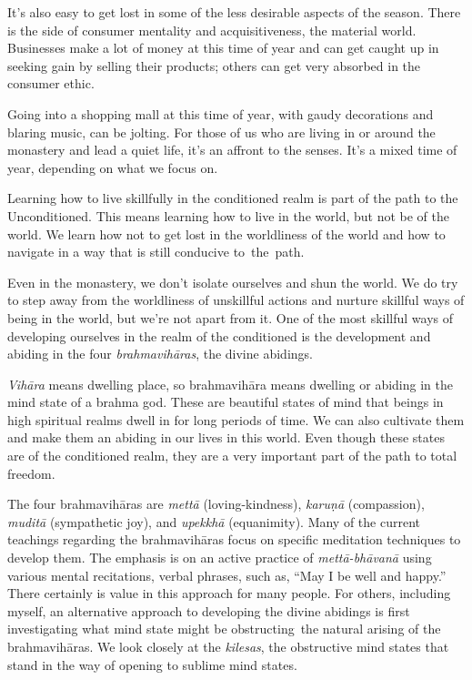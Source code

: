 It's also easy to get lost in some of the less desirable aspects of the season. There is the side of consumer mentality and acquisitiveness, the material world. Businesses make a lot of money at this time of year and can get caught up in seeking gain by selling their products; others can get very absorbed in the consumer ethic.

Going into a shopping mall at this time of year, with gaudy decorations and blaring music, can be jolting. For those of us who are living in or around the monastery and lead a quiet life, it's an affront to the senses. It's a mixed time of year, depending on what we focus on.

Learning how to live skillfully in the conditioned realm is part of the path to the Unconditioned. This means learning how to live in the world, but not be of the world. We \linebreak learn how not to get lost in the worldliness of the world and how to navigate in a way that is still conducive \mbox{to the path.}{\parfillskip=0pt \par}

Even in the monastery, we don't isolate ourselves and shun the world. We do try to step away from the worldliness of unskillful actions and nurture skillful ways of being in the world, but we're not apart from it. One of the most skillful ways of developing ourselves in the realm of the conditioned is the development and abiding in the four \emph{brahmavihāras}, the divine abidings.

\emph{Vihāra} means dwelling place, so brahmavihāra means dwelling or abiding in the mind state of a brahma god. These are beautiful states of mind that beings in high spiritual realms dwell in for long periods of time. We can also cultivate them and make them an abiding in our lives in this world. Even though these states are of the conditioned realm, they are a very important part of the path to total freedom.

\enlargethispage{1\baselineskip}
The four brahmavihāras are \emph{mettā} (loving-kindness), \emph{karuṇā} (compassion), \emph{muditā} (sympathetic joy), and \emph{upekkhā} (equanimity). Many of the current teachings regarding the brahmavihāras focus on specific meditation techniques to develop them. The emphasis is on an active practice of \emph{mettā-bhāvanā} using various mental recitations, verbal phrases, such as, ``May I be well and happy.'' There certainly is value in this approach for many people. For others, including myself, an alternative approach to developing the divine abidings is first investigating what mind state might be \mbox{obstructing the} natural arising of the brahmavihāras. We look closely at \linebreak the \emph{kilesas}, the obstructive mind states that stand in the way of opening to sublime mind states.

